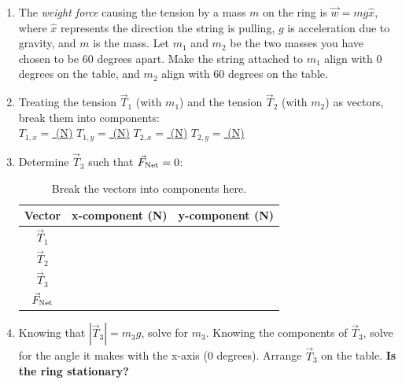 \documentclass{article}
\begin{document}
\begin{enumerate}
\item The \textit{weight force} causing the tension by a mass $m$ on the ring is $\vec{w} = m g \hat{x}$, where $\hat{x}$ represents the direction the string is pulling, $g$ is acceleration due to gravity, and $m$ is the mass.  Let $m_1$ and $m_2$ be the two masses you have chosen to be 60 degrees apart.  Make the string attached to $m_1$ align with 0 degrees on the table, and $m_2$ align with 60 degrees on the table.
\item Treating the tension $\vec{T}_1$ (with $m_1$) and the tension $\vec{T}_2$ (with $m_2$) as vectors, break them into components:
\\
\underline{$T_{1,x}=$ \hspace{1cm} (N)} \hspace{0.5cm} \underline{$T_{1,y}=$ \hspace{1cm} (N)} \hspace{0.5cm} \underline{$T_{2,x}=$ \hspace{1cm} (N)} \hspace{0.5cm} \underline{$T_{2,y}=$ \hspace{1cm} (N)}
\item Determine $\vec{T}_3$ such that $\vec{F}_{\rm Net} = 0$:
\begin{table}[hb]
\centering
\begin{tabular}{| c | c | c |}
\hline
Vector & x-component (N) & y-component (N) \\ \hline
$\vec{T}_1$ & & \\ \hline
$\vec{T}_2$ & & \\ \hline
$\vec{T}_3$ & & \\ \hline
$\vec{F}_{\rm Net}$ & & \\ \hline
\end{tabular}
\caption{\label{tab:data} Break the vectors into components here.}
\end{table}
\item Knowing that $|\vec{T}_3| = m_3 g$, solve for $m_3$.  Knowing the components of $\vec{T}_3$, solve for the angle it makes with the x-axis (0 degrees).  Arrange $\vec{T}_3$ on the table.  \textbf{Is the ring stationary?}
\end{enumerate}
\end{document}
